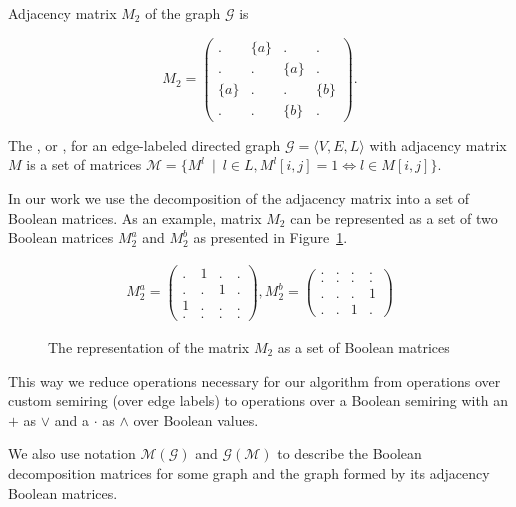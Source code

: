 Adjacency matrix $M_2$ of the graph $\mathcal{G}$ is 

$$
    M_2 =
    \begin{pmatrix}
    . & \{a\} & . & .     \\
    . & . & \{a\} & .     \\
    \{a\} & . & . & \{b\} \\
    . & . & \{b\} & .
    \end{pmatrix}.
$$

\begin{definition}
The , or ,
for an edge-labeled directed graph $\mathcal{G} = 
\langle V,E,L \rangle$ with adjacency matrix $M$ is a set of matrices $\mathcal{M} = \{ M^l~\mid~l \in L,M^l[i,j] = 1 \iff l \in M[i,j]\}$.
\end{definition}

In our work we use the decomposition of the adjacency matrix into a set of Boolean matrices. As an example, matrix $M_2$ can be represented as a set of two Boolean matrices $M_2^a$ and $M_2^b$ as presented in Figure~\ref{fig:boolean_decomposition_of_graph}.

\begin{figure}[h]
    \centering
\begin{align}
M_2^{a} =
\begin{pmatrix}
    . & 1 & . & .   \\
    . & . & 1 & .   \\
    1 & . & . & .   \\
    . & . & . & .  
\end{pmatrix}, 
M_2^{b} =
\begin{pmatrix}      
    . & . & . & .   \\
    . & . & . & .   \\
    . & . & . & 1   \\
    . & . & 1 & . 
\end{pmatrix}
\end{align}
   \caption{The representation of the matrix $M_2$ as a set of Boolean matrices}
\label{fig:boolean_decomposition_of_graph}
\end{figure}

This way we reduce operations necessary for our algorithm from
operations over custom semiring (over edge labels) to operations over a Boolean semiring with an  $+$ as $\lor$ and a  $\cdot$ as $\land$ over Boolean values.

We also use notation $\mathcal{M}(\mathcal{G})$ and $\mathcal{G}(\mathcal{M})$ to describe the Boolean decomposition matrices for some graph and the graph formed by its adjacency Boolean matrices.

